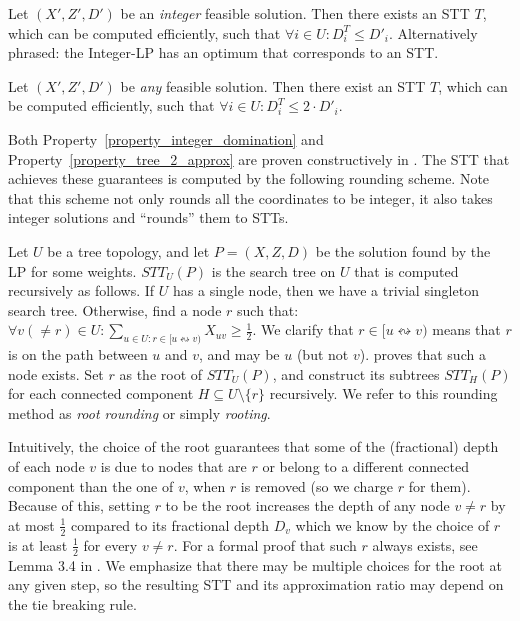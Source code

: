 \begin{property}
\label{property_integer_domination}
Let $(X',Z',D')$ be an \emph{integer} feasible solution. Then there exists an STT $T$, which can be computed efficiently, such that $\forall i \in U: D^T_i \le D'_i$. Alternatively phrased: the Integer-LP has an optimum that corresponds to an STT.
\end{property}

\begin{property}[$2$-Approximation]
\label{property_tree_2_approx}
Let $(X',Z',D')$ be \emph{any} feasible solution. Then there exist an STT $T$, which can be computed efficiently, such that $\forall i \in U: D^T_i \le 2 \cdot D'_i$.
\end{property}

Both Property~\ref{property_integer_domination} and Property~\ref{property_tree_2_approx} are proven constructively in \cite{GolinskyThesis}. The STT that achieves these guarantees is computed by the following rounding scheme. Note that this scheme not only rounds all the coordinates to be integer, it also takes integer solutions and ``rounds'' them to STTs.

\begin{definition}
\label{definition_rounding_scheme}
Let $U$ be a tree topology, and let $P = (X,Z,D)$ be the solution found by the LP for some weights. ${STT}_U(P)$ is the search tree on $U$ that is computed recursively as follows.
If $U$ has a single node, then we have a trivial singleton search tree. Otherwise, find a node $r$ such that: $\forall v (\ne r) \in U: \sum_{u \in U:r \in [u \leftrightsquigarrow v)}X_{uv} \ge \frac{1}{2}$. We clarify that $r \in [u \leftrightsquigarrow v)$ means that $r$ is on the path between $u$ and $v$, and may be $u$ (but not $v$). \cite{GolinskyThesis} proves that such a node exists. Set $r$ as the root of $STT_U(P)$, and construct its subtrees ${STT}_H(P)$  for each connected component $H \subseteq U \setminus \{r\}$ recursively. We refer to this rounding method as \emph{root rounding} or simply \emph{rooting}.
\end{definition}

Intuitively, the choice of the root guarantees that some of the (fractional) depth of each node $v$ is due to nodes that are $r$ or belong to a different connected component than the one of $v$, when $r$ is removed (so we charge $r$ for them). Because of this, setting $r$ to be the root increases the depth of any node $v \ne r$ by at most $\frac{1}{2}$ compared to
its fractional depth $D_v$ which we know by the choice of $r$ is at least $\frac{1}{2}$ for every $v \ne r$. For a formal proof that such $r$ always exists, see Lemma 3.4 in \cite{GolinskyThesis}. We emphasize that there may be multiple choices for the root at any given step, so the resulting STT and its approximation ratio may depend on the tie breaking rule.


